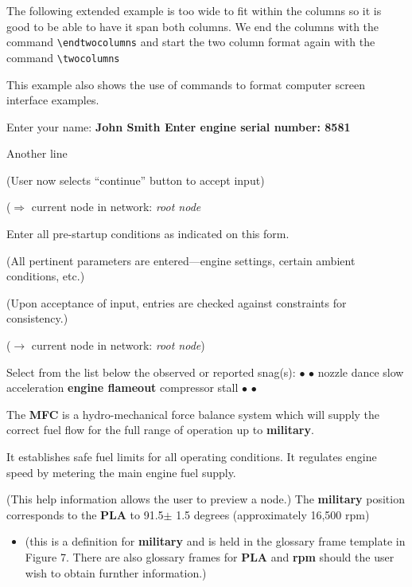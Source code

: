 \begin{article}
The following extended example is too wide to fit within the columns
so it is good to be able to have it span both columns.
We end the columns with the command \verb+\endtwocolumns+
and start the two column format again with the command
\verb+\twocolumns+


This example also shows the use of commands to format
computer screen interface examples.
\endtwocolumns

\begin{interface}
\window
Enter your name: \bf John Smith
Enter engine serial number: \bf 8581

Another line
\endwindow

(User now selects ``continue'' button to accept input)

($\Rightarrow$ current node in network: {\it root node}


\window
Enter all pre-startup conditions as indicated on this form.
\endwindow

(All pertinent parameters are entered---engine settings, certain ambient 
conditions, etc.)

(Upon acceptance of input, entries are checked against constraints for 
consistency.)

($\rightarrow$ current node in network: {\it root node})




\window
Select from the list below the observed or reported snag(s):
\hskip20pt$\bullet$
\hskip20pt$\bullet$
nozzle dance
slow acceleration
{\bf engine flameout}
compressor stall
\hskip20pt$\bullet$
\hskip20pt$\bullet$
\endwindow

\window
The {\bf MFC} is a hydro-mechanical force balance system which will supply the
correct fuel flow for the full range of operation up to {\bf military}.

It establishes safe fuel limits for all operating conditions.
It regulates engine speed by metering the main engine fuel supply.
\endwindow

(This help information allows the user to preview a node.)
\window
The {\bf military} position corresponds to the {\bf PLA} to 91.5$\pm$ 1.5
degrees (approximately 16,500 rpm)
\endwindow

\begin{itemize}
\item[]
(this is a definition for {\bf military} and is held in the glossary
frame template in Figure 7.  There
are also glossary frames for {\bf PLA} and {\bf rpm} should the user wish
to obtain furnther information.)
\end{itemize}
\end{interface}


\end{article}
